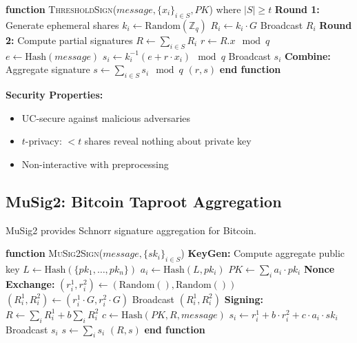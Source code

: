 \begin{algorithmic}[1]
\State \textbf{function} \textsc{ThresholdSign}($message, \{x_i\}_{i \in S}, PK$) where $|S| \geq t$
    \State \textbf{Round 1:} Generate ephemeral shares
        \State $k_i \gets \text{Random}(\mathbb{Z}_q)$
        \State $R_i \gets k_i \cdot G$
        \State Broadcast $R_i$
    \EndFor
    \State
    \State \textbf{Round 2:} Compute partial signatures
    \State $R \gets \sum_{i \in S} R_i$
    \State $r \gets R.x \mod q$ 
    \State $e \gets \text{Hash}(message)$
        \State $s_i \gets k_i^{-1}(e + r \cdot x_i) \mod q$
        \State Broadcast $s_i$
    \EndFor
    \State
    \State \textbf{Combine:} Aggregate signature
    \State $s \gets \sum_{i \in S} s_i \mod q$
    \State \Return $(r, s)$ 
\State \textbf{end function}
\end{algorithmic}


\textbf{Security Properties:}
\begin{itemize}
\item UC-secure against malicious adversaries
\item $t$-privacy: $< t$ shares reveal nothing about private key
\item Non-interactive with preprocessing
\end{itemize}

\subsection{MuSig2: Bitcoin Taproot Aggregation}

MuSig2 \cite{musig2} provides Schnorr signature aggregation for Bitcoin.



\begin{algorithmic}[1]
\State \textbf{function} \textsc{MuSig2Sign}($message, \{sk_i\}_{i \in S}$)
    \State \textbf{KeyGen:} Compute aggregate public key
    \State $L \gets \text{Hash}(\{pk_1, \ldots, pk_n\})$
        \State $a_i \gets \text{Hash}(L, pk_i)$
    \EndFor
    \State $PK \gets \sum_{i} a_i \cdot pk_i$
    \State
    \State \textbf{Nonce Exchange:}
        \State $(r_i^1, r_i^2) \gets (\text{Random}(), \text{Random}())$
        \State $(R_i^1, R_i^2) \gets (r_i^1 \cdot G, r_i^2 \cdot G)$
        \State Broadcast $(R_i^1, R_i^2)$
    \EndFor
    \State
    \State \textbf{Signing:}
    \State $R \gets \sum_{i} R_i^1 + b \sum_{i} R_i^2$ 
    \State $c \gets \text{Hash}(PK, R, message)$
        \State $s_i \gets r_i^1 + b \cdot r_i^2 + c \cdot a_i \cdot sk_i$
        \State Broadcast $s_i$
    \EndFor
    \State $s \gets \sum_i s_i$
    \State \Return $(R, s)$ 
\State \textbf{end function}
\end{algorithmic}


